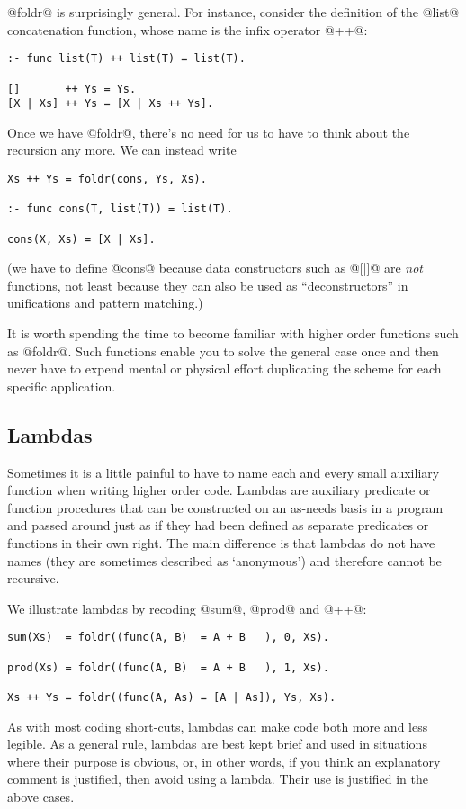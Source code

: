 \documentclass[a4paper,11pt,notitlepage,onecolumn]{article}
\begin{document}
@foldr@ is surprisingly general.  For instance, consider the definition
of the @list@ concatenation function, whose name is the infix operator
@++@:
\begin{verbatim}
:- func list(T) ++ list(T) = list(T).

[]       ++ Ys = Ys.
[X | Xs] ++ Ys = [X | Xs ++ Ys].
\end{verbatim}
Once we have @foldr@, there's no need for us to have to think about the
recursion any more.  We can instead write
\begin{verbatim}
Xs ++ Ys = foldr(cons, Ys, Xs).

:- func cons(T, list(T)) = list(T).

cons(X, Xs) = [X | Xs].
\end{verbatim}
(we have to define @cons@ because data constructors such as @[|]@ are
\emph{not} functions, not least because they can also be used as
``deconstructors'' in unifications and pattern matching.)

It is worth spending the time to become familiar with higher order
functions such as @foldr@.  Such functions enable you to solve the
general case once and then never have to expend mental or physical
effort duplicating the scheme for each specific application.

\subsection{Lambdas}

Sometimes it is a little painful to have to name each and every small
auxiliary function when writing higher order code.  Lambdas are
auxiliary predicate or function procedures that can be constructed on an
as-needs basis in a program and passed around just as if they had been
defined as separate predicates or functions in their own right.  The
main difference is that lambdas do not have names (they are sometimes
described as `anonymous') and therefore cannot be recursive.

We illustrate lambdas by recoding @sum@, @prod@ and @++@:
\begin{verbatim}
sum(Xs)  = foldr((func(A, B)  = A + B   ), 0, Xs).

prod(Xs) = foldr((func(A, B)  = A + B   ), 1, Xs).

Xs ++ Ys = foldr((func(A, As) = [A | As]), Ys, Xs).
\end{verbatim}
As with most coding short-cuts, lambdas can make code both more and less
legible.  As a general rule, lambdas are best kept brief and used in
situations where their purpose is obvious, or, in other words, if you
think an explanatory comment is justified, then avoid using a lambda.
Their use is justified in the above cases.
\end{document}
